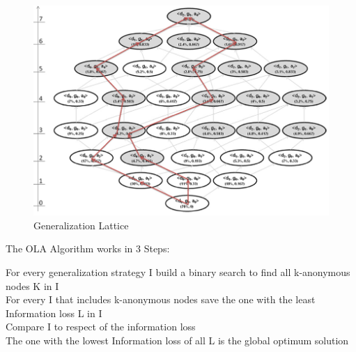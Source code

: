 \documentclass{llncs}
\begin{document}
\begin{figure}
	\centering
	\includegraphics[width=1.0\textwidth]{lattice.png}
	\caption{Generalization Lattice\cite{el2009globally}}%
	\label{lattice}
\end{figure}


\begin{algorithm}[H]
\caption{The OLA Algorithm works in 3 Steps:}
{
For every generalization strategy I build a binary search to find all k-anonymous nodes K in I\\
For every I that includes k-anonymous nodes save the one with the least Information loss L in I\\
Compare I to respect of the information loss\\
The one with the lowest Information loss of all L is the global optimum solution\\
}
\end{algorithm}
\end{document}
